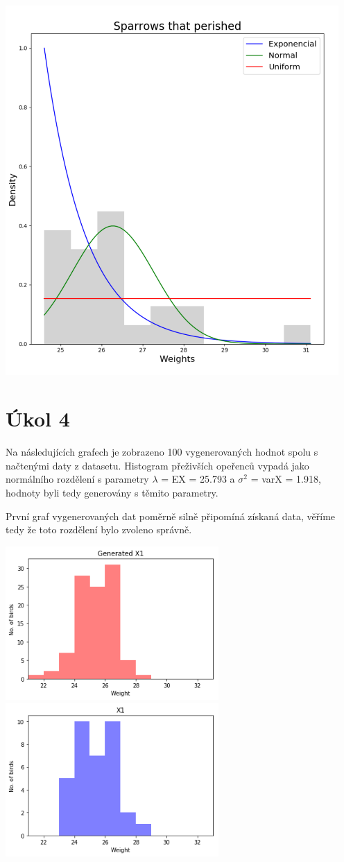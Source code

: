 \documentclass[12pt,a4paper]{article}
\begin{document}
\begin{center}
\includegraphics[width=5in]{3_died}
\end{center}
\section{Úkol 4}
Na následujících grafech je zobrazeno 100 vygenerovaných hodnot spolu s načtenými daty z datasetu. Histogram přeživších opeřenců vypadá jako normálního rozdělení s parametry $\lambda$ = EX = 25.793 a $\sigma ^2$ = varX = 1.918, hodnoty byli tedy generovány s těmito parametry. 

První graf vygenerovaných dat poměrně silně připomíná získaná data, věříme tedy že toto rozdělení bylo zvoleno správně.

\includegraphics[width=3.2in]{4_Survived_Gen}
\includegraphics[width=3.2in]{4_Survived_Data}
\end{document}
